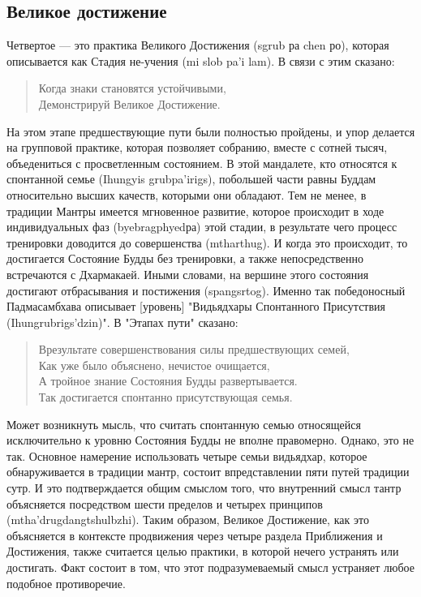 \subsection{Великое достижение}
Четвертое — это практика Великого Достижения (sgrub ра chen ро), которая
описывается как Стадия не-учения (mi slob pa'i lam). В связи с этим сказано:
\begin{verse}
Когда знаки становятся устойчивыми,\\
Демонстрируй Великое Достижение.
\end{verse}
На этом этапе предшествующие пути были полностью пройдены, и упор делается на
групповой практике, которая позволяет собранию, вместе с сотней тысяч, объедениться с
просветленным состоянием. В этой мандалете, кто относятся к спонтанной семье (Ihungyis
grubpa'irigs), побольшей части равны Буддам относительно высших качеств, которыми они
обладают. Тем не менее, в традиции Мантры имеется мгновенное развитие, которое
происходит в ходе индивидуальных фаз (byebragphyedра) этой стадии, в результате чего
процесс тренировки доводится до совершенства (mtharthug). И когда это происходит, то 
достигается Состояние Будды без тренировки, а также непосредственно встречаются с
Дхармакаей. Иными словами, на вершине этого состояния достигают отбрасывания и
постижения (spangsrtog). Именно так победоносный Падмасамбхава описывает [уровень]
"Видьядхары Спонтанного Присутствия (Ihungrubrigs'dzin)". В "Этапах пути" сказано:
\begin{verse}
Врезультате совершенствования силы предшествующих семей,\\
Как уже было объяснено, нечистое очищается,\\
А тройное знание Состояния Будды развертывается.\\
Так достигается спонтанно присутствующая семья.
\end{verse}
Может возникнуть мысль, что считать спонтанную семью относящейся
исключительно к уровню Состояния Будды не вполне правомерно. Однако, это не так.
Основное намерение использовать четыре семьи видьядхар, которое обнаруживается в
традиции мантр, состоит впредставлении пяти путей традиции сутр. И это подтверждается 
общим смыслом того, что внутренний смысл тантр объясняется посредством шести пределов 
и четырех принципов (mtha'drugdangtshulbzhi). Таким образом, Великое Достижение, как 
это объясняется в контексте продвижения через четыре раздела Приближения и Достижения, 
также считается целью практики, в которой нечего устранять или достигать. Факт состоит в 
том, что этот подразумеваемый смысл устраняет любое подобное противоречие.\\

